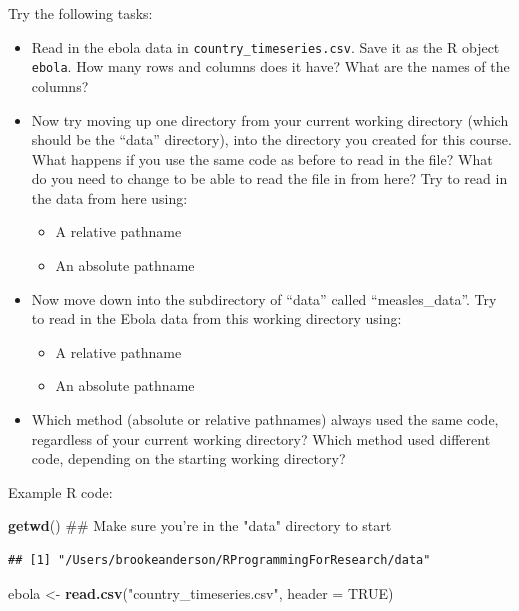 \documentclass[]{book}
\makeatletter
\newenvironment{Shaded}{\begin{snugshade}}{\end{snugshade}}
\newcommand{\KeywordTok}[1]{\textcolor[rgb]{0.13,0.29,0.53}{\textbf{#1}}}
\newcommand{\DataTypeTok}[1]{\textcolor[rgb]{0.13,0.29,0.53}{#1}}
\newcommand{\StringTok}[1]{\textcolor[rgb]{0.31,0.60,0.02}{#1}}
\newcommand{\OtherTok}[1]{\textcolor[rgb]{0.56,0.35,0.01}{#1}}
\newcommand{\NormalTok}[1]{#1}
\providecommand{\tightlist}{%
  \setlength{\itemsep}{0pt}\setlength{\parskip}{0pt}}
\newenvironment{kframe}{%
\medskip{}
\setlength{\fboxsep}{.8em}
 \def\at@end@of@kframe{}%
 \ifinner\ifhmode%
  \def\at@end@of@kframe{\end{minipage}}%
  \begin{minipage}{\columnwidth}%
 \fi\fi%
 \def\FrameCommand##1{\hskip\@totalleftmargin \hskip-\fboxsep
 \colorbox{shadecolor}{##1}\hskip-\fboxsep
     \hskip-\linewidth \hskip-\@totalleftmargin \hskip\columnwidth}%
 \MakeFramed {\advance\hsize-\width
   \@totalleftmargin\z@ \linewidth\hsize
   \@setminipage}}%
 {\par\unskip\endMakeFramed%
 \at@end@of@kframe}
\renewenvironment{Shaded}{\begin{kframe}}{\end{kframe}}
\theoremstyle{definition}
\theoremstyle{definition}
\theoremstyle{definition}
\theoremstyle{remark}
\makeatother
\begin{document}
Try the following tasks:

\begin{itemize}
\tightlist
\item
  Read in the ebola data in \texttt{country\_timeseries.csv}. Save it as
  the R object \texttt{ebola}. How many rows and columns does it have?
  What are the names of the columns?
\item
  Now try moving up one directory from your current working directory
  (which should be the ``data'' directory), into the directory you
  created for this course. What happens if you use the same code as
  before to read in the file? What do you need to change to be able to
  read the file in from here? Try to read in the data from here using:

  \begin{itemize}
  \tightlist
  \item
    A relative pathname
  \item
    An absolute pathname
  \end{itemize}
\item
  Now move down into the subdirectory of ``data'' called
  ``measles\_data''. Try to read in the Ebola data from this working
  directory using:

  \begin{itemize}
  \tightlist
  \item
    A relative pathname
  \item
    An absolute pathname
  \end{itemize}
\item
  Which method (absolute or relative pathnames) always used the same
  code, regardless of your current working directory? Which method used
  different code, depending on the starting working directory?
\end{itemize}

Example R code:

\begin{Shaded}
\begin{Highlighting}[]
\KeywordTok{getwd}\NormalTok{()  ## Make sure you're in the "data" directory to start}
\end{Highlighting}
\end{Shaded}

\begin{verbatim}
## [1] "/Users/brookeanderson/RProgrammingForResearch/data"
\end{verbatim}

\begin{Shaded}
\begin{Highlighting}[]
\NormalTok{ebola <-}\StringTok{ }\KeywordTok{read.csv}\NormalTok{(}\StringTok{"country_timeseries.csv"}\NormalTok{, }\DataTypeTok{header =} \OtherTok{TRUE}\NormalTok{)}
\end{Highlighting}
\end{Shaded}
\end{document}
